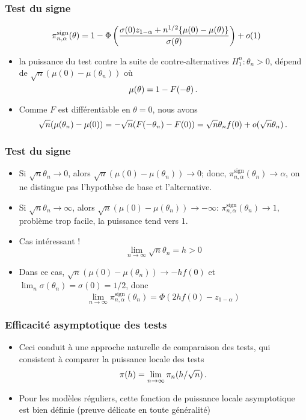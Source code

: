 \begin{frame}
\frametitle{Test du signe}
$$
\pi^{\mathrm{sign}}_{n,\alpha}(\theta)=
1 - \Phi\left( \frac{\sigma(0) z_{1-\alpha} + n^{1/2} \{ \mu(0) - \mu(\theta)\}}{\sigma(\theta)} \right) + o(1)
$$
\begin{itemize}
\item  la puissance du test contre la suite de contre-alternatives $H_1^n: \theta_n > 0$, dépend de $\sqrt{n} (\mu(0) - \mu(\theta_n))$ où
\[
\mu(\theta) = 1 - F(-\theta) \,.
\]
\item Comme $F$ est différentiable en $\theta = 0$, nous avons
\[
\sqrt{n}(\mu(\theta_n) - \mu(0))= - \sqrt{n} ( F(-\theta_n) - F(0)) =  \sqrt{n} \theta_n f(0) + o(\sqrt{n} \theta_n) \,.
\]
\end{itemize}
\end{frame}

\begin{frame}
\frametitle{Test du signe}
\begin{itemize}
\item Si $\sqrt{n} \theta_n \to 0$, alors $\sqrt{n}(\mu(0)- \mu(\theta_n)) \to
  0$; donc, $\pi_{n,\alpha}^{\mathrm{sign}}(\theta_n) \to \alpha$, on ne
  distingue pas l'hypothèse de base et l'alternative.
\item Si $\sqrt{n} \theta_n \to \infty$, alors $\sqrt{n}(\mu(0)- \mu(\theta_n)) \to -\infty$: $\pi_{n,\alpha}^{\mathrm{sign}}(\theta_n) \to 1$, problème \alert{trop facile}, la puissance tend vers $1$.
\item Cas intéressant !
\alert{
\[
\lim_{n \to \infty} \sqrt{n} \theta_n= h > 0
\]
}
\item Dans ce cas, $\sqrt{n}(\mu(0)- \mu(\theta_n)) \to -h f(0)$ et $\lim_n \sigma(\theta_n) = \sigma(0)=1/2$, donc 
\alert{
\[
\lim_{n \to \infty} \pi_{n,\alpha}^{\mathrm{sign}}(\theta_n) = \Phi(2 h f(0) - z_{1-\alpha})
\]
}
\end{itemize}
\end{frame}

\begin{frame}
\frametitle{Efficacité asymptotique des tests}
\begin{itemize}
\item Ceci conduit à une approche naturelle de comparaison des tests, qui consistent à comparer la \alert{puissance locale des tests}
\alert{
\[
\pi(h)= \lim_{n \to \infty} \pi_n( h / \sqrt{n}) \,.
\]
}
\item Pour les modèles réguliers, cette fonction de \alert{puissance locale asymptotique} est bien définie (preuve délicate en toute généralité)
\end{itemize}
\end{frame}

